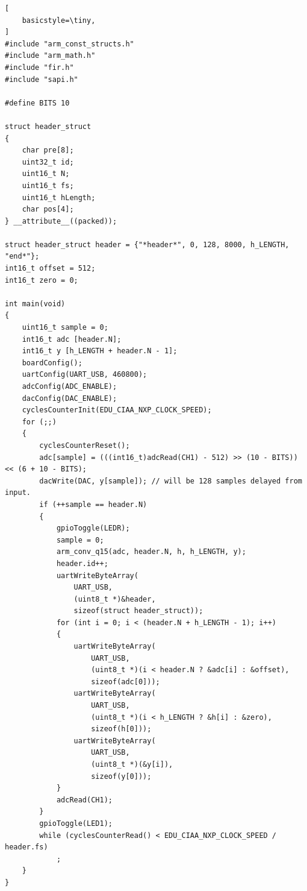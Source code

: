 \documentclass[
    11pt,
    spanish,
	a4paper
]{article}
\begin{document}
\begin{lstlisting}[
    basicstyle=\tiny,
]
#include "arm_const_structs.h"
#include "arm_math.h"
#include "fir.h"
#include "sapi.h"

#define BITS 10

struct header_struct
{
    char pre[8];
    uint32_t id;
    uint16_t N;
    uint16_t fs;
    uint16_t hLength;
    char pos[4];
} __attribute__((packed));

struct header_struct header = {"*header*", 0, 128, 8000, h_LENGTH, "end*"};
int16_t offset = 512;
int16_t zero = 0;

int main(void)
{
    uint16_t sample = 0;
    int16_t adc [header.N];
    int16_t y [h_LENGTH + header.N - 1];
    boardConfig();
    uartConfig(UART_USB, 460800);
    adcConfig(ADC_ENABLE);
    dacConfig(DAC_ENABLE);
    cyclesCounterInit(EDU_CIAA_NXP_CLOCK_SPEED);
    for (;;)
    {
        cyclesCounterReset();
        adc[sample] = (((int16_t)adcRead(CH1) - 512) >> (10 - BITS)) << (6 + 10 - BITS);
        dacWrite(DAC, y[sample]); // will be 128 samples delayed from input.
        if (++sample == header.N)
        {
            gpioToggle(LEDR);
            sample = 0;
            arm_conv_q15(adc, header.N, h, h_LENGTH, y);
            header.id++;
            uartWriteByteArray(
                UART_USB,
                (uint8_t *)&header,
                sizeof(struct header_struct));
            for (int i = 0; i < (header.N + h_LENGTH - 1); i++)
            {
                uartWriteByteArray(
                    UART_USB,
                    (uint8_t *)(i < header.N ? &adc[i] : &offset),
                    sizeof(adc[0]));
                uartWriteByteArray(
                    UART_USB,
                    (uint8_t *)(i < h_LENGTH ? &h[i] : &zero),
                    sizeof(h[0]));
                uartWriteByteArray(
                    UART_USB,
                    (uint8_t *)(&y[i]),
                    sizeof(y[0]));
            }
            adcRead(CH1);
        }
        gpioToggle(LED1);
        while (cyclesCounterRead() < EDU_CIAA_NXP_CLOCK_SPEED / header.fs)
            ;
    }
}
\end{lstlisting}
\end{document}
